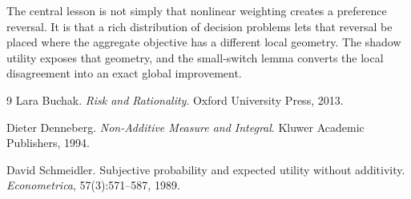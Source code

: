 \documentclass[11pt,a4paper]{article}
\theoremstyle{definition}
\begin{document}
The central lesson is not simply that nonlinear weighting creates a
preference reversal. It is that a rich distribution of decision problems
lets that reversal be placed where the aggregate objective has a different
local geometry. The shadow utility exposes that geometry, and the small-switch
lemma converts the local disagreement into an exact global improvement.

\begin{thebibliography}{9}
Lara Buchak.
\newblock \emph{Risk and Rationality}.
\newblock Oxford University Press, 2013.

Dieter Denneberg.
\newblock \emph{Non-Additive Measure and Integral}.
\newblock Kluwer Academic Publishers, 1994.

David Schmeidler.
\newblock Subjective probability and expected utility without additivity.
\newblock \emph{Econometrica}, 57(3):571--587, 1989.
\end{thebibliography}
\end{document}

